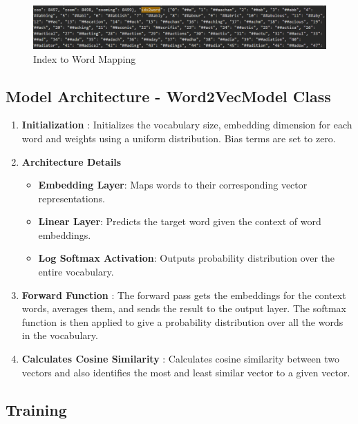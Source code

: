 \documentclass{article}
\begin{document}
\begin{figure}[H]
    \centering
    \includegraphics[width=1\linewidth]{image9.png} %
    \caption{Index to Word Mapping}
    \label{fig:enter-task1}
\end{figure}

\subsection{Model Architecture - Word2VecModel Class}
\begin{enumerate}
\item \textbf{Initialization} : Initializes the vocabulary size, embedding dimension for each word and weights using a uniform distribution. Bias terms are set to zero.
\item \textbf{Architecture Details}

\begin{itemize}
\item \textbf{Embedding Layer}: Maps words to their corresponding vector representations.
\item \textbf{Linear Layer}: Predicts the target word given the context of word embeddings.
\item \textbf{Log Softmax Activation}: Outputs probability distribution over the entire vocabulary.
\end{itemize}

\item \textbf{Forward Function} : The forward pass gets the embeddings for the context words, averages them, and sends the result to the output layer. The softmax function is then applied to give a probability distribution over all the words in the vocabulary.
\item \textbf{Calculates Cosine Similarity} : Calculates cosine similarity between two vectors and also identifies the most and least similar vector to a given vector.

\end{enumerate}


\subsection{Training}
\end{document}
